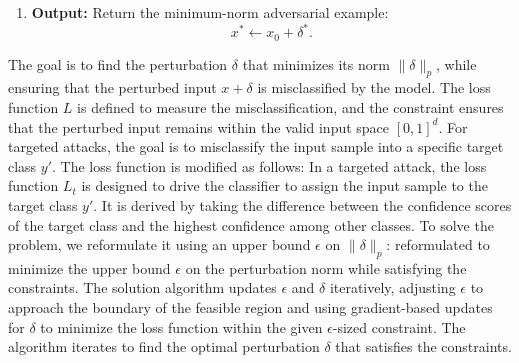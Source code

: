 \begin{enumerate}
    \item \textbf{Output:}  
    Return the minimum-norm adversarial example:
    \[
    x^* \leftarrow x_0 + \delta^*.
    \]
\end{enumerate}



The goal is to find the perturbation $\delta$ that minimizes its norm $\|\delta\|_p$, while ensuring that the perturbed input $x + \delta$ is misclassified by the model. The loss function $L$ is defined to measure the misclassification, and the constraint ensures that the perturbed input remains within the valid input space $[0, 1]^d$.
For targeted attacks, the goal is to misclassify the input sample into a specific target class $y'$. The loss function is modified as follows:
In a targeted attack, the loss function $L_t$ is designed to drive the classifier to assign the input sample to the target class $y'$. It is derived by taking the difference between the confidence scores of the target class and the highest confidence among other classes.
To solve the problem, we reformulate it using an upper bound $\epsilon$ on $\|\delta\|_p$:
reformulated to minimize the upper bound $\epsilon$ on the perturbation norm while satisfying the constraints. The solution algorithm updates $\epsilon$ and $\delta$ iteratively, adjusting $\epsilon$ to approach the boundary of the feasible region and using gradient-based updates for $\delta$ to minimize the loss function within the given $\epsilon$-sized constraint. The algorithm iterates to find the optimal perturbation $\delta$ that satisfies the constraints.